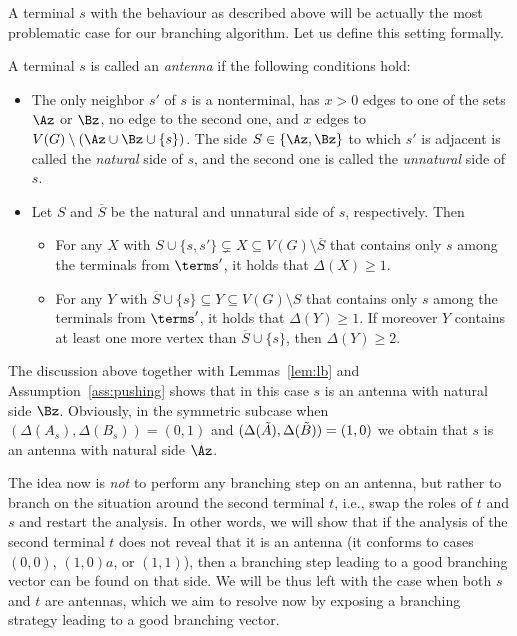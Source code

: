 A terminal $s$ with the behaviour as described above will be actually the most problematic case for our branching algorithm. Let us define this setting formally.
\begin{definition}
A terminal $s$ is called an {\em{antenna}} if the following conditions hold:
\begin{itemize}
\item The only neighbor $s'$ of $s$ is a nonterminal, has $x>0$ edges to one of the sets $\Az$ or $\Bz$, no edge to the second one, and $x$ edges to $V(G)\setminus (\Az\cup\Bz\cup \{s\})$. The side $S\in \{\Az,\Bz\}$ to which $s'$ is adjacent is called the {\em{natural}} side of $s$, and the second one is called the {\em{unnatural}} side of $s$.
\item Let $S$ and $\overline{S}$ be the natural and unnatural side of $s$, respectively. Then 
\begin{itemize}
\item For any $X$ with $S\cup \{s,s'\} \subsetneq X \subseteq V(G)\setminus \overline{S}$ that contains only $s$ among the terminals from $\terms'$, it holds that $\Delta(X)\geq 1$.
\item For any $Y$ with $\overline{S}\cup \{s\}\subseteq Y\subseteq V(G)\setminus S$ that contains only $s$ among the terminals from $\terms'$, it holds that $\Delta(Y)\geq 1$. If moreover $Y$ contains at least one more vertex than $\overline{S}\cup \{s\}$, then $\Delta(Y)\geq 2$.
\end{itemize}
\end{itemize}
\end{definition}

The discussion above together with Lemmas~\ref{lem:lb} and Assumption~\ref{ass:pushing} shows that in this case $s$ is an antenna with natural side $\Bz$. Obviously, in the symmetric subcase when $(\Delta(A_s),\Delta(B_s))=(0,1)$ and $(\Delta(\tilde{A}),\Delta(\tilde{B}))=(1,0)$ we obtain that $s$ is an antenna with natural side $\Az$. 

The idea now is {\em{not}} to perform any branching step on an antenna, but rather to branch on the situation around the second terminal $t$, i.e., swap the roles of $t$ and $s$ and restart the analysis.
In other words, we will show that if the analysis of the second terminal $t$ does not reveal that it is an antenna (it conforms to cases $(0,0)$, $(1,0)a$, or $(1,1)$), then a branching step leading to a good branching vector can be found on that side. We will be thus left with the case when both $s$ and $t$ are antennas, which we aim to resolve now by exposing a branching strategy leading to a good branching vector.

